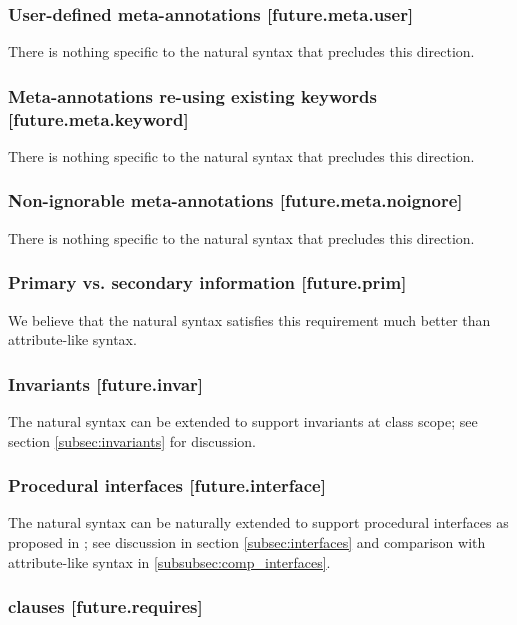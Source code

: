 \subsubsection{User-defined meta-annotations  [future.meta.user]}

There is nothing specific to the natural syntax that precludes this direction.

\subsubsection{Meta-annotations re-using existing keywords  [future.meta.keyword]}

There is nothing specific to the natural syntax that precludes this direction.

\subsubsection{Non-ignorable meta-annotations  [future.meta.noignore]}

There is nothing specific to the natural syntax that precludes this direction.

\subsubsection{Primary vs. secondary information  [future.prim]}

We believe that the natural syntax satisfies this requirement much better than attribute-like syntax.

\subsubsection{Invariants  [future.invar]}

The natural syntax can be extended to support invariants at class scope; see section \ref{subsec:invariants} for discussion.

\subsubsection{Procedural interfaces  [future.interface]}

The natural syntax can be naturally extended to support procedural interfaces as proposed in \cite{P0465R0}; see discussion in section \ref{subsec:interfaces} and comparison with attribute-like syntax in \ref{subsubsec:comp_interfaces}.

\subsubsection{ clauses  [future.requires]}

